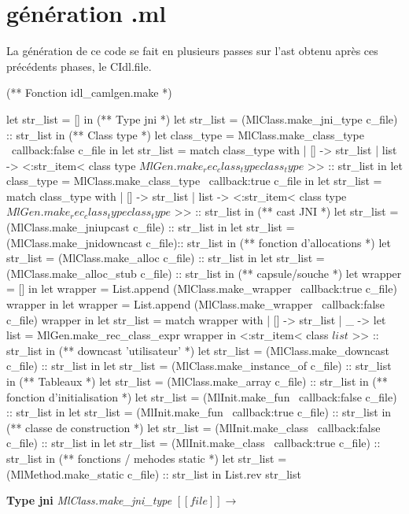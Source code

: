 \documentclass[a4paper, 11pt]{report}
\begin{document}
\section{génération .ml}

La génération de ce code se fait en plusieurs passes sur l'ast obtenu
après ces précédents phases, le CIdl.file.
\begin{OCaml}
(** Fonction idl_camlgen.make *)

  let str_list = [] in
  (** Type jni *)
  let str_list = (MlClass.make_jni_type c_file) :: str_list in
  (** Class type *)
  let class_type = MlClass.make_class_type ~callback:false c_file in
  let str_list = match class_type with 
  | [] -> str_list 
  | list -> <:str_item< class type $MlGen.make_rec_class_type class_type$ >> :: str_list in
  let class_type = MlClass.make_class_type ~callback:true c_file in
  let str_list = match class_type with 
  | [] -> str_list 
  | list -> <:str_item< class type $MlGen.make_rec_class_type class_type$ >> :: str_list in
  (** cast JNI *)
  let str_list = (MlClass.make_jniupcast c_file) :: str_list in
  let str_list = (MlClass.make_jnidowncast c_file):: str_list in 
  (** fonction d'allocations *)
  let str_list = (MlClass.make_alloc c_file) :: str_list in
  let str_list = (MlClass.make_alloc_stub c_file) :: str_list in
  (** capsule/souche *)
  let wrapper = [] in
  let wrapper = List.append (MlClass.make_wrapper ~callback:true c_file) wrapper in
  let wrapper = List.append (MlClass.make_wrapper ~callback:false c_file) wrapper in
  let str_list = match wrapper with 
    | [] -> str_list 
    | _ ->
        let list = MlGen.make_rec_class_expr wrapper in
        <:str_item< class $list$ >> :: str_list
  in
  (** downcast 'utilisateur' *)
  let str_list = (MlClass.make_downcast c_file) :: str_list in
  let str_list = (MlClass.make_instance_of c_file) :: str_list in
  (** Tableaux *)
  let str_list = (MlClass.make_array c_file) :: str_list in
  (** fonction d'initialisation *)
  let str_list = (MlInit.make_fun ~callback:false c_file) :: str_list in
  let str_list = (MlInit.make_fun ~callback:true c_file) :: str_list in
  (** classe de construction *)
  let str_list = (MlInit.make_class ~callback:false c_file) :: str_list in
  let str_list = (MlInit.make_class ~callback:true c_file) :: str_list in
  (** fonctions / mehodes static *)
  let str_list = (MlMethod.make_static c_file) :: str_list in
  List.rev str_list
\end{OCaml}

\textbf{Type jni}
\emph{MlClass.make\_jni\_type}
\newline
$[\![ file ]\!]$$\longrightarrow$
\end{document}
